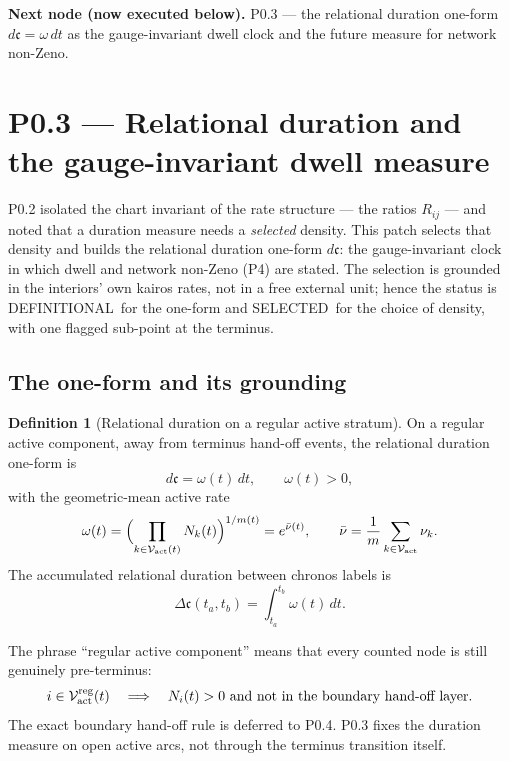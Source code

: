 \documentclass[11pt,a4paper]{article}
\newcommand{\stDef}{\textcolor{cDef}{\textsf{\small DEFINITIONAL}}}
\newcommand{\stSelected}{\textcolor{cSel}{\textsf{\small SELECTED}}}
\theoremstyle{definition}
\newtheorem{definition}{Definition}[section]
\theoremstyle{plain}
\theoremstyle{remark}
\begin{document}
\medskip
\textbf{Next node (now executed below).} P0.3 --- the relational duration one-form
\(d\mathfrak c=\omega\,dt\) as the gauge-invariant dwell clock and the future measure
for network non-Zeno.

\section{P0.3 --- Relational duration and the gauge-invariant dwell measure}

P0.2 isolated the chart invariant of the rate structure --- the ratios \(R_{ij}\) ---
and noted that a duration measure needs a \emph{selected} density. This patch selects
that density and builds the relational duration one-form \(d\mathfrak c\): the
gauge-invariant clock in which dwell and network non-Zeno (P4) are stated. The
selection is grounded in the interiors' own kairos rates, not in a free external
unit; hence the status is \stDef\ for the one-form and \stSelected\ for the choice of
density, with one flagged sub-point at the terminus.

\subsection{The one-form and its grounding}

\begin{definition}[Relational duration on a regular active stratum]
On a regular active component, away from terminus hand-off events, the relational
duration one-form is
\[
d\mathfrak c=\omega(t)\,dt,\qquad \omega(t)>0,
\]
with the geometric-mean active rate
\[
\omega(t)=\Bigl(\prod_{k\in\mathcal V_{\rm act}(t)}N_k(t)\Bigr)^{1/m(t)}
=e^{\bar\nu(t)},
\qquad
\bar\nu=\frac{1}{m}\sum_{k\in\mathcal V_{\rm act}}\nu_k .
\]
The accumulated relational duration between chronos labels is
\[
\Delta\mathfrak c(t_a,t_b)=\int_{t_a}^{t_b}\omega(t)\,dt .
\]
\end{definition}

The phrase ``regular active component'' means that every counted node is still
genuinely pre-terminus:
\[
i\in\mathcal V_{\rm act}^{\rm reg}(t)
\quad\Longrightarrow\quad
N_i(t)>0
\ \text{and not in the boundary hand-off layer}.
\]
The exact boundary hand-off rule is deferred to P0.4. P0.3 fixes the duration
measure on open active arcs, not through the terminus transition itself.
\end{document}
